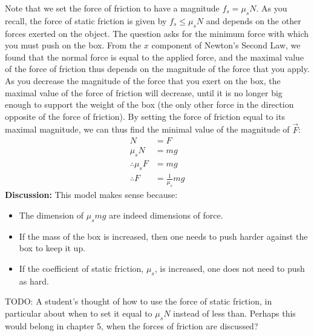 \begin{example}
Note that we set the force of friction to have a magnitude $f_s = \mu_s N$. As you recall, the force of static friction is given by $f_s \leq \mu_s N$ and depends on the other forces exerted on the object. The question asks for the minimum force with which you must push on the box. From the $x$ component of Newton's Second Law, we found that the normal force is equal to the applied force, and the maximal value of the force of friction thus depends on the magnitude of the force that you apply. As you decrease the magnitude of the force that you exert on the box, the maximal value of the force of friction will decrease, until it is no longer big enough to support the weight of the box (the only other force in the direction opposite of the force of friction). By setting the force of friction equal to its maximal magnitude, we can thus find the minimal value of the magnitude of $\vec F$:
\begin{align*}
N&=F\\
\mu_sN &= mg\\
\therefore \mu_s F &= mg\\
\therefore F &= \frac{1}{\mu_s}mg
\end{align*}
\textbf{Discussion:} This model makes sense because:
\begin{itemize}
\item The dimension of $\mu_s mg$ are indeed dimensions of force.
\item If the mass of the box is increased, then one needs to push harder against the box to keep it up.
\item If the coefficient of static friction, $\mu_s$, is increased, one does not need to push as hard. 
\end{itemize}
\end{example}

TODO: A student's thought of how to use the force of static friction, in particular about when to set it equal to $\mu_sN$ instead of less than. Perhaps this would belong in chapter 5, when the forces of friction are discussed?



